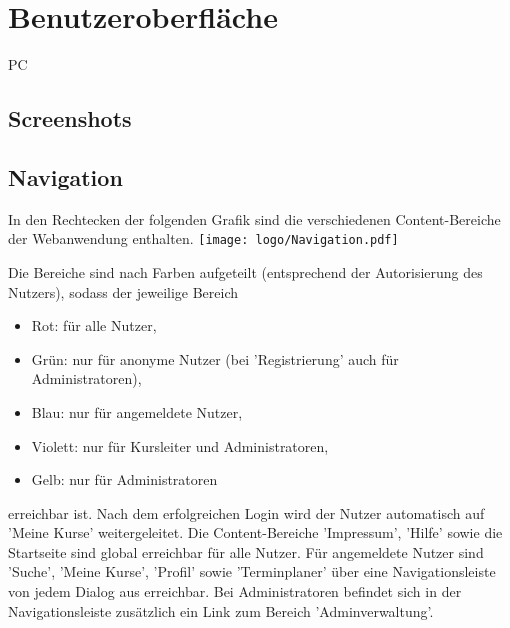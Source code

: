 \documentclass[a4paper]{scrreprt}
\begin{document}
		
 
\chapter{Benutzeroberfläche}
	\begin{tiny}
		PC
	\end{tiny}
   
    \section{Screenshots}
    
	    \subsection{}
    
	    \subsection{}
    
    \section{Navigation}
	    In den Rechtecken der folgenden Grafik sind die verschiedenen Content-Bereiche der Webanwendung enthalten.
		    \newline
		    \newline
			    \texttt{[image: logo/Navigation.pdf]}
		    \newline
    
	    Die Bereiche sind  nach Farben aufgeteilt (entsprechend der Autorisierung des Nutzers), sodass der jeweilige Bereich
	    \begin{itemize}
		    \item Rot: für alle Nutzer,
		    \item Grün: nur für anonyme Nutzer (bei 'Registrierung' auch für Administratoren),
		    \item Blau: nur für angemeldete Nutzer,
		    \item Violett: nur für Kursleiter und Administratoren,
		    \item Gelb: nur für Administratoren
	    \end{itemize}
	    erreichbar ist.
	    \newline
	    Nach dem erfolgreichen Login wird der Nutzer automatisch auf 'Meine Kurse' weitergeleitet.
	    \newline
	    Die Content-Bereiche 'Impressum', 'Hilfe' sowie die Startseite sind global erreichbar für alle Nutzer.
	    \newline
	    Für angemeldete Nutzer sind 'Suche', 'Meine Kurse', 'Profil' sowie 'Terminplaner' über eine Navigationsleiste von jedem Dialog aus erreichbar.
	    \newline
	    Bei Administratoren befindet sich in der Navigationsleiste zusätzlich ein Link zum Bereich 'Adminverwaltung'.
        
\end{document}
